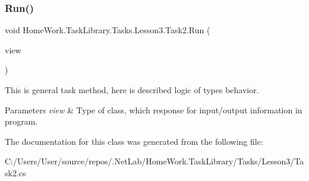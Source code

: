 \subsubsection{\texorpdfstring{Run()}{Run()}}
{\footnotesize\ttfamily void Home\+Work.\+Task\+Library.\+Tasks.\+Lesson3.\+Task2.\+Run (\begin{DoxyParamCaption}\item[{I\+Information}]{view }\end{DoxyParamCaption})}



This is general task method, here is described logic of types behavior. 


\begin{DoxyParams}{Parameters}
{\em view} & Type of class, which response for input/output information in program.\\
\hline
\end{DoxyParams}


The documentation for this class was generated from the following file\+:\begin{DoxyCompactItemize}
\item 
C\+:/\+Users/\+User/source/repos/.\+Net\+Lab/\+Home\+Work.\+Task\+Library/\+Tasks/\+Lesson3/Task2.\+cs\end{DoxyCompactItemize}
